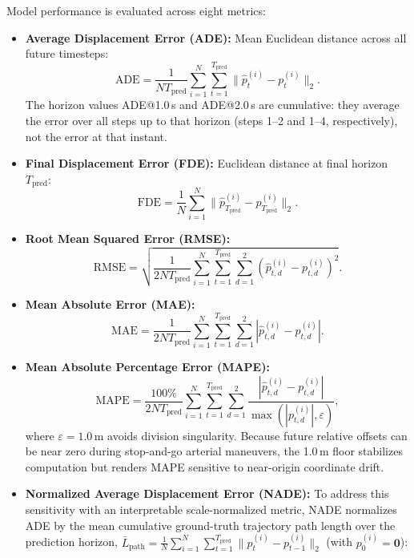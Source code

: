 \documentclass[journal]{IEEEtran}
\begin{document}
Model performance is evaluated across eight metrics:
\begin{itemize}
    \item \textbf{Average Displacement Error (ADE):} Mean Euclidean distance across all future timesteps:
    \begin{equation}
    \mathrm{ADE} = \frac{1}{N T_{\mathrm{pred}}} \sum_{i=1}^N \sum_{t=1}^{T_{\mathrm{pred}}} \|\hat{p}_t^{(i)} - p_t^{(i)}\|_2.
    \label{eq:ade}
    \end{equation}
    The horizon values ADE@1.0\,s and ADE@2.0\,s are cumulative: they average the error over all steps up to that horizon (steps 1--2 and 1--4, respectively), not the error at that instant.
    \item \textbf{Final Displacement Error (FDE):} Euclidean distance at final horizon $T_{\mathrm{pred}}$:
    \begin{equation}
    \mathrm{FDE} = \frac{1}{N} \sum_{i=1}^N \|\hat{p}_{T_{\mathrm{pred}}}^{(i)} - p_{T_{\mathrm{pred}}}^{(i)}\|_2.
    \label{eq:fde}
    \end{equation}
    \item \textbf{Root Mean Squared Error (RMSE):}
    \begin{equation}
    \mathrm{RMSE} = \sqrt{\frac{1}{2 N T_{\mathrm{pred}}} \sum_{i=1}^N \sum_{t=1}^{T_{\mathrm{pred}}} \sum_{d=1}^2 (\hat{p}_{t, d}^{(i)} - p_{t, d}^{(i)})^2}.
    \label{eq:rmse}
    \end{equation}
    \item \textbf{Mean Absolute Error (MAE):}
    \begin{equation}
    \mathrm{MAE} = \frac{1}{2 N T_{\mathrm{pred}}} \sum_{i=1}^N \sum_{t=1}^{T_{\mathrm{pred}}} \sum_{d=1}^2 |\hat{p}_{t, d}^{(i)} - p_{t, d}^{(i)}|.
    \label{eq:mae}
    \end{equation}
    \item \textbf{Mean Absolute Percentage Error (MAPE):}
    \begin{equation}
    \mathrm{MAPE} = \frac{100\%}{2 N T_{\mathrm{pred}}} \sum_{i=1}^N \sum_{t=1}^{T_{\mathrm{pred}}} \sum_{d=1}^2 \frac{|\hat{p}_{t, d}^{(i)} - p_{t, d}^{(i)}|}{\max(|p_{t, d}^{(i)}|, \varepsilon)},
    \label{eq:mape}
    \end{equation}
    where $\varepsilon = 1.0$\,m avoids division singularity. Because future relative offsets can be near zero during stop-and-go arterial maneuvers, the 1.0\,m floor stabilizes computation but renders MAPE sensitive to near-origin coordinate drift.
    \item \textbf{Normalized Average Displacement Error (NADE):} To address this sensitivity with an interpretable scale-normalized metric, NADE normalizes ADE by the mean cumulative ground-truth trajectory path length over the prediction horizon, $\bar{L}_{\mathrm{path}} = \frac{1}{N} \sum_{i=1}^N \sum_{t=1}^{T_{\mathrm{pred}}} \|p_t^{(i)} - p_{t-1}^{(i)}\|_2$ (with $p_0^{(i)} = \mathbf{0}$):

\end{itemize}
\end{document}
